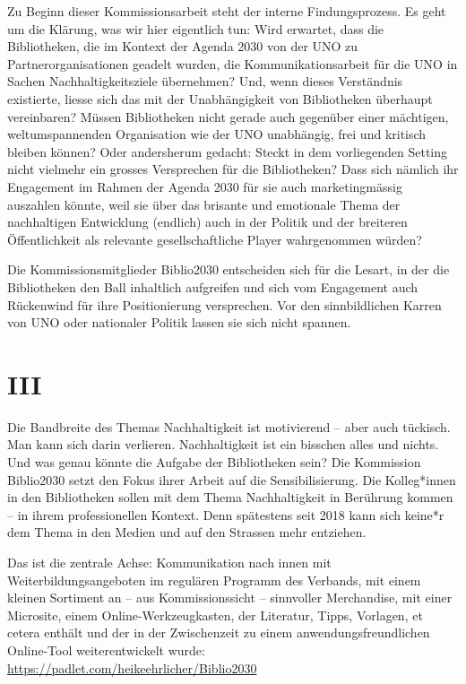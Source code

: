\documentclass[a4paper,
fontsize=11pt,
oneside,
numbers=noperiodatend,
parskip=half-,
bibliography=totoc,
final
]{scrartcl}
\begin{document}
Zu Beginn dieser Kommissionsarbeit steht der interne Findungsprozess. Es
geht um die Klärung, was wir hier eigentlich tun: Wird erwartet, dass
die Bibliotheken, die im Kontext der Agenda 2030 von der UNO zu
Partnerorganisationen geadelt wurden, die Kommunikationsarbeit für die
UNO in Sachen Nachhaltigkeitsziele übernehmen? Und, wenn dieses
Verständnis existierte, liesse sich das mit der Unabhängigkeit von
Bibliotheken überhaupt vereinbaren? Müssen Bibliotheken nicht gerade
auch gegenüber einer mächtigen, weltumspannenden Organisation wie der
UNO unabhängig, frei und kritisch bleiben können? Oder andersherum
gedacht: Steckt in dem vorliegenden Setting nicht vielmehr ein grosses
Versprechen für die Bibliotheken? Dass sich nämlich ihr Engagement im
Rahmen der Agenda 2030 für sie auch marketingmässig auszahlen könnte,
weil sie über das brisante und emotionale Thema der nachhaltigen
Entwicklung (endlich) auch in der Politik und der breiteren
Öffentlichkeit als relevante gesellschaftliche Player wahrgenommen
würden?

Die Kommissionsmitglieder Biblio2030 entscheiden sich für die Lesart, in
der die Bibliotheken den Ball inhaltlich aufgreifen und sich vom
Engagement auch Rückenwind für ihre Positionierung versprechen. Vor den
sinnbildlichen Karren von UNO oder nationaler Politik lassen sie sich
nicht spannen.

\hypertarget{iii}{%
\section{III}\label{iii}}

Die Bandbreite des Themas Nachhaltigkeit ist motivierend -- aber auch
tückisch. Man kann sich darin verlieren. Nachhaltigkeit ist ein bisschen
alles und nichts. Und was genau könnte die Aufgabe der Bibliotheken
sein? Die Kommission Biblio2030 setzt den Fokus ihrer Arbeit auf die
Sensibilisierung. Die Kolleg*innen in den Bibliotheken sollen mit dem
Thema Nachhaltigkeit in Berührung kommen -- in ihrem professionellen
Kontext. Denn spätestens seit 2018 kann sich keine*r dem Thema in den
Medien und auf den Strassen mehr entziehen.

Das ist die zentrale Achse: Kommunikation nach innen mit
Weiterbildungsangeboten im regulären Programm des Verbands, mit einem
kleinen Sortiment an -- aus Kommissionssicht -- sinnvoller Merchandise,
mit einer Microsite, einem Online-Werkzeugkasten, der Literatur, Tipps,
Vorlagen, et cetera enthält und der in der Zwischenzeit zu einem
anwendungsfreundlichen Online-Tool weiterentwickelt wurde:
\url{https://padlet.com/heikeehrlicher/Biblio2030}
\end{document}
